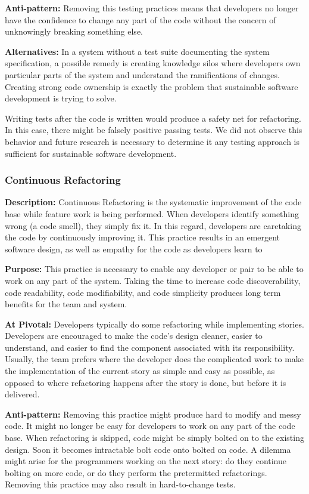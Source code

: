 \begin{table}[]
\textbf{Anti-pattern:} Removing this testing practices means that developers no longer have the confidence to change any part of the code without the concern of unknowingly breaking something else. 

\textbf{Alternatives:} In a system without a test suite documenting the system specification, a possible remedy is creating knowledge silos where developers own particular parts of the system and understand the ramifications of changes. Creating strong code ownership is exactly the problem that sustainable software development is trying to solve.

Writing tests after the code is written would produce a safety net for refactoring. In this case, there might be falsely positive passing tests. We did not observe this behavior and future research is necessary to determine it any testing approach is sufficient for sustainable software development.

\subsubsection{Continuous Refactoring}
\textbf{Description:} Continuous Refactoring is the systematic improvement of the code base while feature work is being performed. When developers identify something wrong (a code smell), they simply fix it. In this regard, developers are caretaking the code by continuously improving it. This practice results in an emergent software design, as well as empathy for the code as developers learn to  

\textbf{Purpose:} This practice is necessary to enable any developer or pair to be able to work on any part of the system. Taking the time to increase code discoverability, code readability, code modifiability, and code simplicity produces long term benefits for the team and system. 

\textbf{At Pivotal:} Developers typically do some refactoring while implementing stories. Developers are encouraged to make the code's design cleaner, easier to understand, and easier to find the component associated with its responsibility. Usually, the team prefers  where the developer does the complicated work to make the implementation of the current story as simple and easy as possible, as opposed to  where refactoring happens after the story is done, but before it is delivered.  

\textbf{Anti-pattern:} Removing this practice might produce hard to modify and messy code. It might no longer be easy for developers to work on any part of the code base. When refactoring is skipped, code might be simply bolted on to the existing design. Soon it becomes intractable bolt code onto bolted on code. A dilemma might arise for the programmers working on the next story: do they continue bolting on more code, or do they perform the pretermitted refactorings. Removing this practice may also result in hard-to-change tests.


\end{table}
